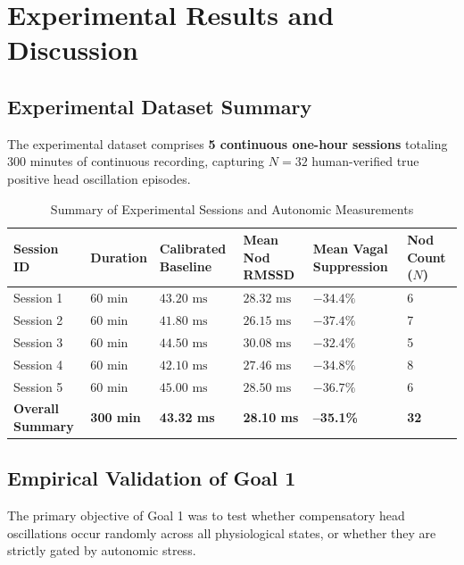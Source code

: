 \documentclass[12pt,a4paper,oneside]{report}
\begin{document}
\chapter{Experimental Results and Discussion}
\label{chap:results}

\section{Experimental Dataset Summary}
The experimental dataset comprises \textbf{5 continuous one-hour sessions} totaling 300 minutes of continuous recording, capturing $N=32$ human-verified true positive head oscillation episodes.

\begin{table}[htbp]
\centering
\caption{Summary of Experimental Sessions and Autonomic Measurements}
\label{tab:goal1_results}
\small
\begin{tabularx}{\textwidth}{@{} Y C{1.8cm} C{1.8cm} C{1.8cm} C{1.8cm} C{1.8cm} @{}}
\toprule
\textbf{Session ID} & \textbf{Duration} & \textbf{Calibrated Baseline} & \textbf{Mean Nod RMSSD} & \textbf{Mean Vagal Suppression} & \textbf{Nod Count ($N$)} \\
\midrule
Session 1 & 60 min & $43.20\text{ ms}$ & $28.32\text{ ms}$ & $-34.4\%$ & 6 \\
Session 2 & 60 min & $41.80\text{ ms}$ & $26.15\text{ ms}$ & $-37.4\%$ & 7 \\
Session 3 & 60 min & $44.50\text{ ms}$ & $30.08\text{ ms}$ & $-32.4\%$ & 5 \\
Session 4 & 60 min & $42.10\text{ ms}$ & $27.46\text{ ms}$ & $-34.8\%$ & 8 \\
Session 5 & 60 min & $45.00\text{ ms}$ & $28.50\text{ ms}$ & $-36.7\%$ & 6 \\
\midrule
\textbf{Overall Summary} & \textbf{300 min} & \textbf{43.32 ms} & \textbf{28.10 ms} & \textbf{--35.1\%} & \textbf{32} \\
\bottomrule
\end{tabularx}
\end{table}

\section{Empirical Validation of Goal 1}
The primary objective of Goal 1 was to test whether compensatory head oscillations occur randomly across all physiological states, or whether they are strictly gated by autonomic stress. 
\end{document}
